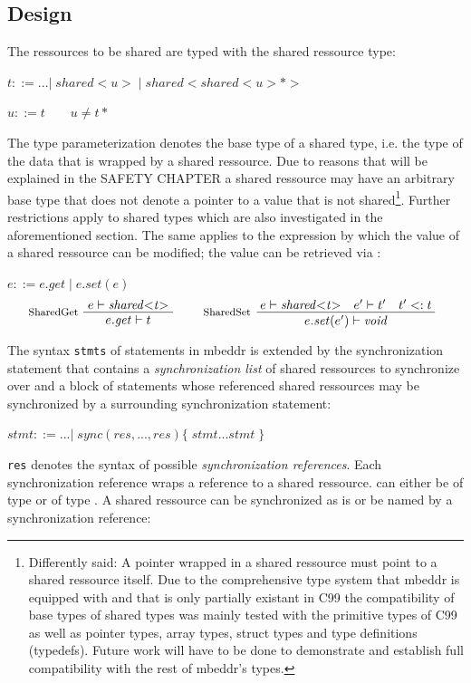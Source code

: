\subsection{Design}
The ressources to be shared are typed with the shared ressource type:

$ t ::= ...|\;\mathit{shared{<}u{>}}\;|\;\mathit{shared{<}shared{<}u{>}{*}{>}}\;$

$ u ::= t \qquad u \neq t*$

The type parameterization denotes the base type of a shared type, i.e. the type of the data that is wrapped by a shared ressource. Due to reasons that will be explained in the SAFETY CHAPTER a shared ressource may have an arbitrary base type that does not denote a pointer to a value that is not shared\footnote{Differently said: A pointer wrapped in a shared ressource must point to a shared ressource itself. Due to the comprehensive type system that mbeddr is equipped with and that is only partially existant in C99 the compatibility of base types of shared types was mainly tested with the primitive types of C99 as well as pointer types, array types, struct types and type definitions (typedefs). Future work will have to be done to demonstrate and establish full compatibility with the rest of mbeddr's types.}. Further restrictions apply to shared types which are also investigated in the aforementioned section. The same applies to the  expression by which the value of a shared ressource can be modified; the value can be retrieved via :

$ e ::= e.\mathit{get}\;|\;e.\mathit{set(e)} $
\begin{align*}
\inference*[SharedGet]{e |- \mathit{shared{<}t{>}}} {\quad e.\mathit{get} |- t \quad}
\qquad
\inference*[SharedSet]{e |- \mathit{shared{<}t{>}} \quad e' |- t' \quad t' <: t} {\qquad\quad e.\mathit{set}(e') |- \mathit{void} \quad\qquad} 
\end{align*}

The syntax \texttt{stmts} of statements in mbeddr is extended by the synchronization statement  that contains a \textit{synchronization list} of shared ressources to synchronize over and a block of statements whose referenced shared ressources may be synchronized by a surrounding synchronization statement:

$ \mathit{stmt} ::= ...
        |\;\mathit{sync}(res, ..., res) \{\;\mathit{stmt} ... \mathit{stmt}\;\}$
        
\texttt{res} denotes the syntax of possible \textit{synchronization references}. Each synchronization reference  wraps a reference  to a shared ressource.  can either be of type  or of type . A shared ressource can be synchronized as is or be named by a synchronization reference:

